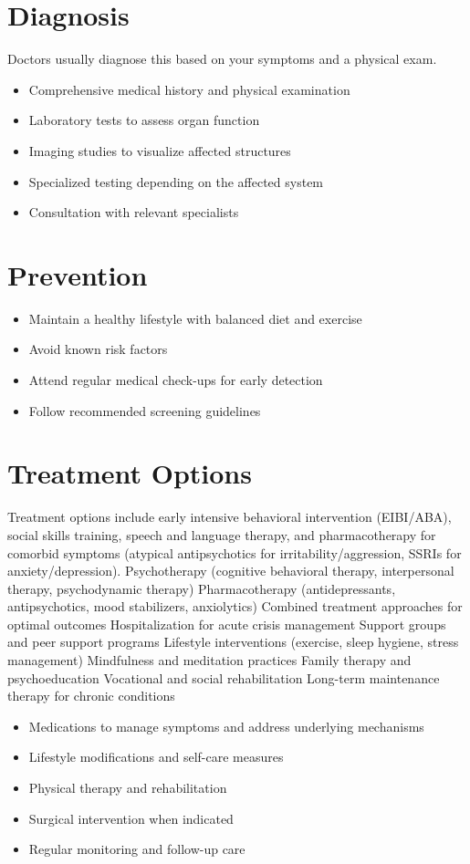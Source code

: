 \section{Diagnosis}
Doctors usually diagnose this based on your symptoms and a physical exam.

\begin{itemize}[noitemsep]
  \item Comprehensive medical history and physical examination
  \item Laboratory tests to assess organ function
  \item Imaging studies to visualize affected structures
  \item Specialized testing depending on the affected system
  \item Consultation with relevant specialists
\end{itemize}
\section{Prevention}
\begin{itemize}[noitemsep]
  \item Maintain a healthy lifestyle with balanced diet and exercise
  \item Avoid known risk factors
  \item Attend regular medical check-ups for early detection
  \item Follow recommended screening guidelines
\end{itemize}
\section{Treatment Options}
Treatment options include early intensive behavioral intervention (EIBI/ABA), social skills training, speech and language therapy, and pharmacotherapy for comorbid symptoms (atypical antipsychotics for irritability/aggression, SSRIs for anxiety/depression). Psychotherapy (cognitive behavioral therapy, interpersonal therapy, psychodynamic therapy) Pharmacotherapy (antidepressants, antipsychotics, mood stabilizers, anxiolytics) Combined treatment approaches for optimal outcomes Hospitalization for acute crisis management Support groups and peer support programs Lifestyle interventions (exercise, sleep hygiene, stress management) Mindfulness and meditation practices Family therapy and psychoeducation Vocational and social rehabilitation Long-term maintenance therapy for chronic conditions

\begin{itemize}[noitemsep]
  \item Medications to manage symptoms and address underlying mechanisms
  \item Lifestyle modifications and self-care measures
  \item Physical therapy and rehabilitation
  \item Surgical intervention when indicated
  \item Regular monitoring and follow-up care
\end{itemize}
